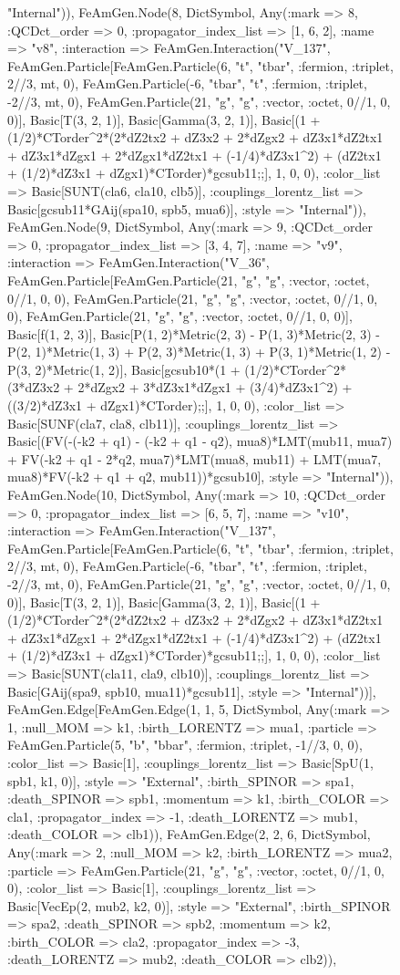 \documentclass{revtex4}
\begin{document}
\begin{figure}[!htb]
\begin{center}
{"Internal")), FeAmGen.Node(8, Dict{Symbol, Any}(:mark => 8, :QCDct_order => 0, :propagator_index_list => [1, 6, 2], :name => "v8", :interaction => FeAmGen.Interaction("V_137", FeAmGen.Particle[FeAmGen.Particle(6, "t", "tbar", :fermion, :triplet, 2//3, mt, 0), FeAmGen.Particle(-6, "tbar", "t", :fermion, :triplet, -2//3, mt, 0), FeAmGen.Particle(21, "g", "g", :vector, :octet, 0//1, 0, 0)], Basic[T(3, 2, 1)], Basic[Gamma(3, 2, 1)], Basic[(1 + (1/2)*CTorder^2*(2*dZ2tx2 + dZ3x2 + 2*dZgx2 + dZ3x1*dZ2tx1 + dZ3x1*dZgx1 + 2*dZgx1*dZ2tx1 + (-1/4)*dZ3x1^2) + (dZ2tx1 + (1/2)*dZ3x1 + dZgx1)*CTorder)*gcsub11;;], 1, 0, 0), :color_list => Basic[SUNT(cla6, cla10, clb5)], :couplings_lorentz_list => Basic[gcsub11*GAij(spa10, spb5, mua6)], :style => "Internal")), FeAmGen.Node(9, Dict{Symbol, Any}(:mark => 9, :QCDct_order => 0, :propagator_index_list => [3, 4, 7], :name => "v9", :interaction => FeAmGen.Interaction("V_36", FeAmGen.Particle[FeAmGen.Particle(21, "g", "g", :vector, :octet, 0//1, 0, 0), FeAmGen.Particle(21, "g", "g", :vector, :octet, 0//1, 0, 0), FeAmGen.Particle(21, "g", "g", :vector, :octet, 0//1, 0, 0)], Basic[f(1, 2, 3)], Basic[P(1, 2)*Metric(2, 3) - P(1, 3)*Metric(2, 3) - P(2, 1)*Metric(1, 3) + P(2, 3)*Metric(1, 3) + P(3, 1)*Metric(1, 2) - P(3, 2)*Metric(1, 2)], Basic[gcsub10*(1 + (1/2)*CTorder^2*(3*dZ3x2 + 2*dZgx2 + 3*dZ3x1*dZgx1 + (3/4)*dZ3x1^2) + ((3/2)*dZ3x1 + dZgx1)*CTorder);;], 1, 0, 0), :color_list => Basic[SUNF(cla7, cla8, clb11)], :couplings_lorentz_list => Basic[(FV(-(-k2 + q1) - (-k2 + q1 - q2), mua8)*LMT(mub11, mua7) + FV(-k2 + q1 - 2*q2, mua7)*LMT(mua8, mub11) + LMT(mua7, mua8)*FV(-k2 + q1 + q2, mub11))*gcsub10], :style => "Internal")), FeAmGen.Node(10, Dict{Symbol, Any}(:mark => 10, :QCDct_order => 0, :propagator_index_list => [6, 5, 7], :name => "v10", :interaction => FeAmGen.Interaction("V_137", FeAmGen.Particle[FeAmGen.Particle(6, "t", "tbar", :fermion, :triplet, 2//3, mt, 0), FeAmGen.Particle(-6, "tbar", "t", :fermion, :triplet, -2//3, mt, 0), FeAmGen.Particle(21, "g", "g", :vector, :octet, 0//1, 0, 0)], Basic[T(3, 2, 1)], Basic[Gamma(3, 2, 1)], Basic[(1 + (1/2)*CTorder^2*(2*dZ2tx2 + dZ3x2 + 2*dZgx2 + dZ3x1*dZ2tx1 + dZ3x1*dZgx1 + 2*dZgx1*dZ2tx1 + (-1/4)*dZ3x1^2) + (dZ2tx1 + (1/2)*dZ3x1 + dZgx1)*CTorder)*gcsub11;;], 1, 0, 0), :color_list => Basic[SUNT(cla11, cla9, clb10)], :couplings_lorentz_list => Basic[GAij(spa9, spb10, mua11)*gcsub11], :style => "Internal"))], FeAmGen.Edge[FeAmGen.Edge(1, 1, 5, Dict{Symbol, Any}(:mark => 1, :null_MOM => k1, :birth_LORENTZ => mua1, :particle => FeAmGen.Particle(5, "b", "bbar", :fermion, :triplet, -1//3, 0, 0), :color_list => Basic[1], :couplings_lorentz_list => Basic[SpU(1, spb1, k1, 0)], :style => "External", :birth_SPINOR => spa1, :death_SPINOR => spb1, :momentum => k1, :birth_COLOR => cla1, :propagator_index => -1, :death_LORENTZ => mub1, :death_COLOR => clb1)), FeAmGen.Edge(2, 2, 6, Dict{Symbol, Any}(:mark => 2, :null_MOM => k2, :birth_LORENTZ => mua2, :particle => FeAmGen.Particle(21, "g", "g", :vector, :octet, 0//1, 0, 0), :color_list => Basic[1], :couplings_lorentz_list => Basic[VecEp(2, mub2, k2, 0)], :style => "External", :birth_SPINOR => spa2, :death_SPINOR => spb2, :momentum => k2, :birth_COLOR => cla2, :propagator_index => -3, :death_LORENTZ => mub2, :death_COLOR => clb2)), }
\end{center}
\end{figure}
\end{document}
